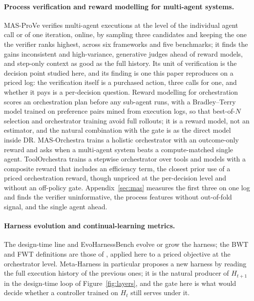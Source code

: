\documentclass[10pt]{article}
\begin{document}
\paragraph{Process verification and reward modelling for multi-agent systems.} MAS-ProVe \citep{masprove2026} verifies multi-agent executions at the level of the individual agent call or of one iteration, online, by sampling three candidates and keeping the one the verifier ranks highest, across six frameworks and five benchmarks; it finds the gains inconsistent and high-variance, generative judges ahead of reward models, and step-only context as good as the full history. Its unit of verification is the decision point studied here, and its finding is one this paper reproduces on a priced log: the verification itself is a purchased action, three calls for one, and whether it pays is a per-decision question. Reward modelling for orchestration \citep{rmorchestration2026} scores an orchestration plan before any sub-agent runs, with a Bradley--Terry model trained on preference pairs mined from execution logs, so that best-of-$N$ selection and orchestrator training avoid full rollouts; it is a reward model, not an estimator, and the natural combination with the gate is as the direct model inside DR. MAS-Orchestra \citep{masorchestra2026} trains a holistic orchestrator with an outcome-only reward and asks when a multi-agent system beats a compute-matched single agent. ToolOrchestra \citep{toolorchestra2025} trains a stepwise orchestrator over tools and models with a composite reward that includes an efficiency term, the closest prior use of a priced orchestration reward, though unpriced at the per-decision level and without an off-policy gate. Appendix~\ref{sec:mas} measures the first three on one log and finds the verifier uninformative, the process features without out-of-fold signal, and the single agent ahead.

\paragraph{Harness evolution and continual-learning metrics.} The design-time line \citep{dgm2025,gepa2025,darwinx2026,metaharness2026,envharness2026,harnessx2026} and EvoHarnessBench \citep{evoharnessbench2026} evolve or grow the harness; the BWT and FWT definitions are those of \citet{lopezpaz2017gem}, applied here to a priced objective at the orchestrator level. Meta-Harness in particular proposes a new harness by reading the full execution history of the previous ones; it is the natural producer of $H_{t+1}$ in the design-time loop of Figure~\ref{fig:layers}, and the gate here is what would decide whether a controller trained on $H_t$ still serves under it.
\end{document}
